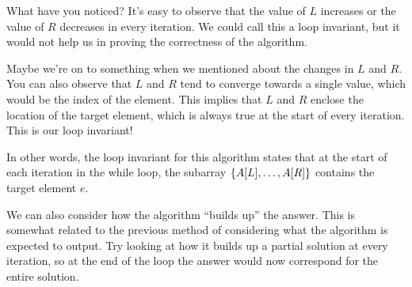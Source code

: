 \begin{example}
    What have you noticed? It's easy to observe that the value of $L$ increases or the value of $R$ decreases in every iteration. We could call this a loop invariant, but it would not help us in proving the correctness of the algorithm.

    Maybe we're on to something when we mentioned about the changes in $L$ and $R$. You can also observe that $L$ and $R$ tend to converge towards a single value, which would be the index of the element. This implies that $L$ and $R$ enclose the location of the target element, which is always true at the start of every iteration. This is our loop invariant!

    In other words, the loop invariant for this algorithm states that at the start of each iteration in the while loop, the subarray $\left\{A[L], \ldots, A[R]\right\}$ contains the target element $e$.
\end{example}

We can also consider how the algorithm ``builds up'' the answer. This is somewhat related to the previous method of considering what the algorithm is expected to output. Try looking at how it builds up a partial solution at every iteration, so at the end of the loop the answer would now correspond for the entire solution.

